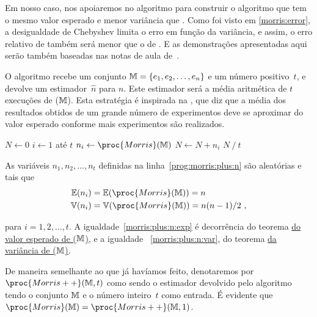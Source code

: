 Em nosso caso, nos apoiaremos no algoritmo  para construir o algoritmo  que tem o mesmo 
valor esperado e menor variância que . Como foi visto em \eqref{morris:error}, a desigualdade de Chebyshev
limita o erro em função da variância, e assim, o erro relativo de  também será menor que o de 
. E as demonstrações apresentadas aqui serão também baseadas nas notas de aula 
de~\citep{LectureNotesAndoni}.

O algoritmo  recebe um conjunto $\mathbb{M} = \{ e_1, e_2, \dots, e_n \}$ e um número positivo~$t$, e devolve 
um estimador~$\hat{n}$ para $n$. Este estimador será a média aritmética de $t$ execuções de ($\mathbb{M}$). Esta 
estratégia é inspirada na , que diz que a média dos resultados obtidos de um grande número 
de experimentos deve se aproximar do valor esperado conforme mais experimentos são realizados.

\begin{codebox}
  \li $N \gets 0$                       \label{prog:morris:plus:start}                
  \li \For $i \gets 1$ até $t$                             
  \li \Do
      $n_i \gets \proc{Morris}(\Mbb)$   \label{prog:morris:plus:n}
  \li $N \gets N + n_i$
      \End
  \li
  \Return $N \mathbin{/} t$
  \End
\end{codebox}

As variáveis $n_1, n_2, \dots, n_t$ definidas na linha~\ref{prog:morris:plus:n} são aleatórias e tais que
\begin{align}
  \Ebb(n_i) &= \Ebb(\proc{Morris}(\Mbb)) = n                \label{morris:plus:n:exp} \\     
  \Vbb(n_i) &= \Vbb(\proc{Morris}(\Mbb)) = n(n - 1)/2 \ ,   \label{morris:plus:n:var}
\end{align}

para $i = 1, 2, \dots, t$. A igualdade~\eqref{morris:plus:n:exp} é decorrência do teorema 
\hyperref[morris:theorem:expected_value]{do valor esperado de ($\mathbb{M}$)}, e a igualdade~
\eqref{morris:plus:n:var}, do teorema \hyperref[morris:theorem:variance]{da variância de ($\mathbb{M}$)}.

De maneira semelhante ao que já havíamos feito, denotaremos por $\proc{Morris++}(\Mbb, t)$ como sendo o estimador 
devolvido pelo algoritmo tendo o conjunto $\mathbb{M}$ e o número inteiro~$t$ como entrada. É evidente que 
$\proc{Morris}(\Mbb) = \proc{Morris++}(\Mbb, 1)$.

